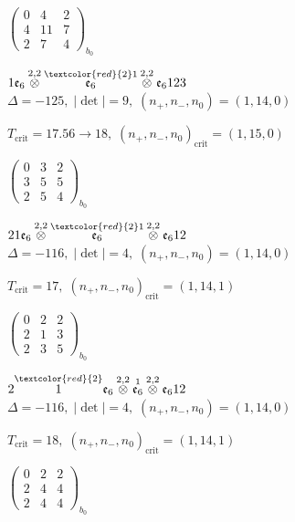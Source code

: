 \documentclass[10pt]{article}
\begin{document}
\hspace{2em}$\left(\begin{smallmatrix}0 & 4 & 2 \\ 4 & 11 & 7 \\ 2 & 7 & 4\end{smallmatrix}\right)_{\!b_0}$

\smallskip

$1\mathfrak{e}_6\overset{2,2}{\otimes}\overset{\textcolor{red}{2}1}{\mathfrak{e}_6}\overset{2,2}{\otimes}\mathfrak{e}_6123$ \quad $\Delta=-125,\; |\det|=9,\; (n_+,n_-,n_0)=(1,14,0)$

\hspace{1em}$T_{\text{crit}}=17.56 \to 18,\; (n_+,n_-,n_0)_{\text{crit}}=(1,15,0)$

\hspace{2em}$\left(\begin{smallmatrix}0 & 3 & 2 \\ 3 & 5 & 5 \\ 2 & 5 & 4\end{smallmatrix}\right)_{\!b_0}$

\smallskip

$21\mathfrak{e}_6\overset{2,2}{\otimes}\overset{\textcolor{red}{2}1}{\mathfrak{e}_6}\overset{2,2}{\otimes}\mathfrak{e}_612$ \quad $\Delta=-116,\; |\det|=4,\; (n_+,n_-,n_0)=(1,14,0)$

\hspace{1em}$T_{\text{crit}}=17,\; (n_+,n_-,n_0)_{\text{crit}}=(1,14,1)$

\hspace{2em}$\left(\begin{smallmatrix}0 & 2 & 2 \\ 2 & 1 & 3 \\ 2 & 3 & 5\end{smallmatrix}\right)_{\!b_0}$

$2\overset{\textcolor{red}{2}}{1}\mathfrak{e}_6\overset{2,2}{\otimes}\overset{1}{\mathfrak{e}_6}\overset{2,2}{\otimes}\mathfrak{e}_612$ \quad $\Delta=-116,\; |\det|=4,\; (n_+,n_-,n_0)=(1,14,0)$

\hspace{1em}$T_{\text{crit}}=18,\; (n_+,n_-,n_0)_{\text{crit}}=(1,14,1)$

\hspace{2em}$\left(\begin{smallmatrix}0 & 2 & 2 \\ 2 & 4 & 4 \\ 2 & 4 & 4\end{smallmatrix}\right)_{\!b_0}$
\end{document}

